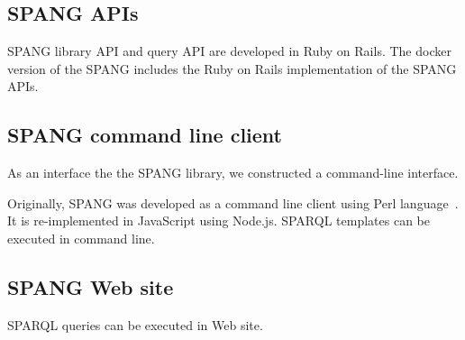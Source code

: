 \documentclass[runningheads]{llncs}
\begin{document}
\subsection{SPANG APIs}
SPANG library API and query API are developed in Ruby on Rails. The docker version of the SPANG includes the Ruby on Rails implementation of the SPANG APIs.


\subsection{SPANG command line client}
As an interface the the SPANG library, we constructed a command-line interface.

Originally, SPANG was developed as a command line client using Perl language~\cite{spang}.
It is re-implemented in JavaScript using Node.js.
SPARQL templates can be executed in command line.



\subsection{SPANG Web site}
SPARQL queries can be executed in Web site.






\end{document}
